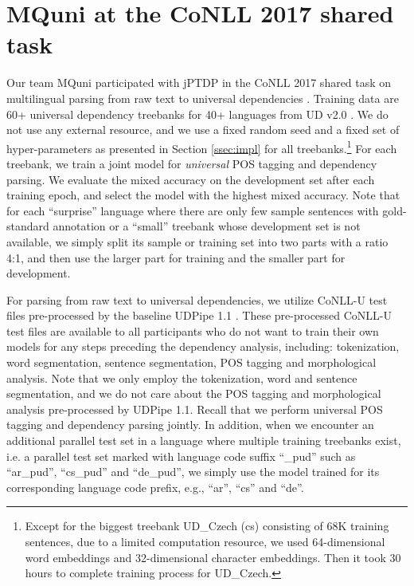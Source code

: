 \documentclass[11pt,letterpaper]{article}
\begin{document}
\section{MQuni at the CoNLL 2017 shared task}

Our team MQuni participated with jPTDP in  the CoNLL 2017 shared task on multilingual parsing from raw text to universal dependencies \citep{udst:overview}.  
Training data are 60+ universal dependency treebanks for 40+ languages from UD v2.0 \citep{ud20data}. 
We do not use any external resource, and we use a fixed random seed and a fixed set of hyper-parameters as presented in Section \ref{ssec:impl}  for all treebanks.\footnote{Except for the biggest treebank UD\_Czech (cs) consisting of 68K training sentences, due to a limited computation resource, we used 64-dimensional word embeddings and 32-dimensional character embeddings. Then it took 30 hours to complete training process for UD\_Czech.} 
For each treebank, we train a joint model for \textit{universal} POS tagging and dependency parsing. We evaluate the mixed accuracy on the development set after each training epoch, and select the model with the highest mixed accuracy. Note that for each ``surprise'' language where there are only few sample sentences with gold-standard annotation or a ``small'' treebank   whose development set is not available, we simply split its sample or training set into two parts with a ratio 4:1, and then use the larger part for training and the smaller part for development. 


For parsing from raw text to universal dependencies, we utilize CoNLL-U test files pre-processed by the baseline UDPipe 1.1 \citep{STRAKA16.873}. These  pre-processed  CoNLL-U test files are available to all participants who do not want to train their own models for any steps preceding the dependency analysis, including: tokenization, word segmentation, sentence segmentation, POS tagging and morphological analysis. Note that we only employ the tokenization, word and sentence segmentation, and we do not care about  the POS tagging and morphological analysis pre-processed by  UDPipe 1.1. Recall that we perform universal POS tagging and dependency parsing jointly. In addition, when we encounter an additional parallel test set in a language where multiple training treebanks exist, i.e. a parallel test set marked with language code suffix ``\_pud'' such as ``ar\_pud'', ``cs\_pud'' and ``de\_pud'', we simply use the model trained for its corresponding language code prefix, e.g., ``ar'', ``cs'' and ``de''. 
\end{document}
